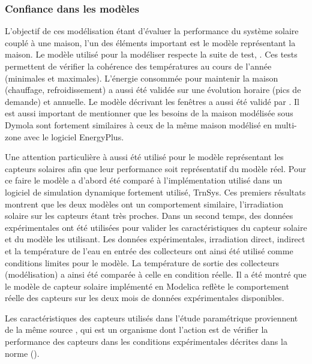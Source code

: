 \subsubsection{Confiance dans les modèles} %
\label{ssub:confiance_dans_les_modeles}
L’objectif de ces modélisation étant d’évaluer la performance du système solaire
couplé à une maison, l’un des éléments important est le modèle représentant la maison.
Le modèle utilisé pour la modéliser respecte la suite de test, .
Ces tests permettent de vérifier la cohérence des températures au cours de l’année
(minimales et maximales). L’énergie consommée pour maintenir la maison (chauffage, refroidissement)
a aussi été validée sur une évolution horaire (pics de demande) et annuelle.
Le modèle décrivant les fenêtres a aussi été validé par .
Il est aussi important de mentionner que les besoins de la maison modélisée sous Dymola
sont fortement similaires à ceux de la même maison modélisé en multi-zone avec le logiciel
EnergyPlus.

Une attention particulière à aussi été utilisé pour le modèle représentant les capteurs
solaires afin que leur performance soit représentatif du modèle réel. Pour ce faire
le modèle a d’abord été comparé à l’implémentation utilisé dans un logiciel de
simulation dynamique fortement utilisé, TrnSys. Ces premiers résultats montrent que
les deux modèles ont un comportement similaire, l’irradiation solaire sur les capteurs
étant très proches.
Dans un second temps, des données expérimentales ont été utilisées pour valider les
caractéristiques du capteur solaire et du modèle les utilisant.
Les données expérimentales, irradiation direct, indirect et la température de l’eau
en entrée des collecteurs ont ainsi été utilisé comme conditions limites pour le
modèle. La température de sortie des collecteurs (modélisation) a ainsi été comparée
à celle en condition réelle. Il a été montré que le modèle de capteur solaire
implémenté en Modelica reflète le comportement réelle des capteurs sur les deux mois
de données expérimentales disponibles.

Les caractéristiques des capteurs utilisés dans l’étude paramétrique proviennent
de la même source , qui est un organisme dont l’action est de
vérifier la performance des capteurs dans les conditions expérimentales décrites
dans la norme ().



